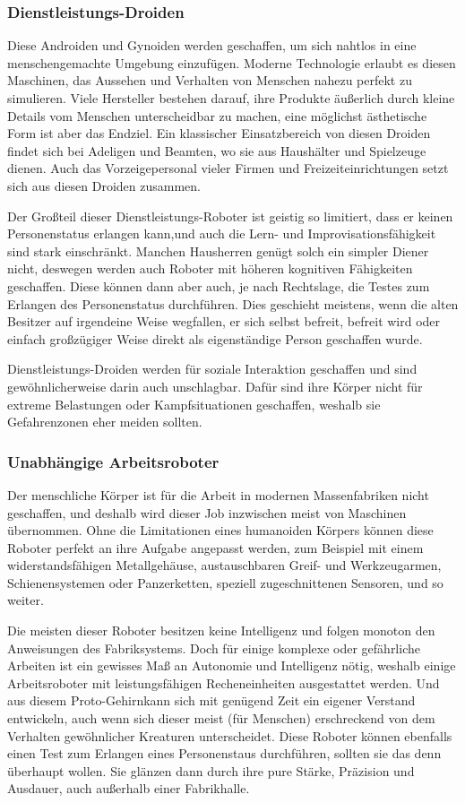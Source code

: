 \subsubsection{Dienstleistungs-Droiden}
Diese Androiden und Gynoiden werden geschaffen, um sich nahtlos in eine menschengemachte Umgebung einzufügen. Moderne Technologie erlaubt es diesen Maschinen, das Aussehen und Verhalten von Menschen nahezu perfekt zu simulieren. Viele Hersteller bestehen darauf, ihre Produkte äußerlich durch kleine Details vom Menschen unterscheidbar zu machen, eine möglichst ästhetische Form ist aber das Endziel. Ein klassischer Einsatzbereich von diesen Droiden findet sich bei Adeligen und Beamten, wo sie aus Haushälter und \glqq Spielzeuge\grqq{} dienen. Auch das \glqq Vorzeigepersonal\grqq{} vieler Firmen und Freizeiteinrichtungen setzt sich aus diesen Droiden zusammen.

Der Großteil dieser Dienstleistungs-Roboter ist geistig so limitiert, dass er keinen Personenstatus erlangen kann,und auch die Lern- und Improvisationsfähigkeit sind stark einschränkt. Manchen Hausherren genügt solch ein simpler Diener nicht, deswegen werden auch Roboter mit höheren kognitiven Fähigkeiten geschaffen. Diese können dann aber auch, je nach Rechtslage, die Testes zum Erlangen des Personenstatus durchführen. Dies geschieht meistens, wenn die alten Besitzer auf irgendeine Weise wegfallen, er sich selbst \glqq befreit\grqq{}, \glqq befreit wird\grqq{} oder einfach großzügiger Weise direkt als eigenständige Person geschaffen wurde.

Dienstleistungs-Droiden werden für soziale Interaktion geschaffen und sind gewöhnlicherweise darin auch unschlagbar. Dafür sind ihre Körper nicht für extreme Belastungen oder Kampfsituationen geschaffen, weshalb sie Gefahrenzonen eher meiden sollten.
\subsubsection{Unabhängige Arbeitsroboter}
Der menschliche Körper ist für die Arbeit in modernen Massenfabriken nicht geschaffen, und deshalb wird dieser Job inzwischen meist von Maschinen übernommen. Ohne die Limitationen eines humanoiden Körpers können diese Roboter perfekt an ihre Aufgabe angepasst werden, zum Beispiel mit einem widerstandsfähigen Metallgehäuse, austauschbaren Greif- und Werkzeugarmen, Schienensystemen oder Panzerketten, speziell zugeschnittenen Sensoren, und so weiter.

Die meisten dieser Roboter besitzen keine Intelligenz und folgen monoton den Anweisungen des Fabriksystems. Doch für einige komplexe oder gefährliche Arbeiten ist ein gewisses Maß an Autonomie und Intelligenz nötig, weshalb einige Arbeitsroboter mit leistungsfähigen Recheneinheiten ausgestattet werden. Und aus diesem \glqq Proto-Gehirn\grqq{}kann sich mit genügend Zeit ein eigener Verstand entwickeln, auch wenn sich dieser meist (für Menschen) erschreckend von dem Verhalten gewöhnlicher Kreaturen unterscheidet. Diese Roboter können ebenfalls einen Test zum Erlangen eines Personenstaus durchführen, sollten sie das denn überhaupt wollen. Sie glänzen dann durch ihre pure Stärke, Präzision und Ausdauer, auch außerhalb einer Fabrikhalle.
